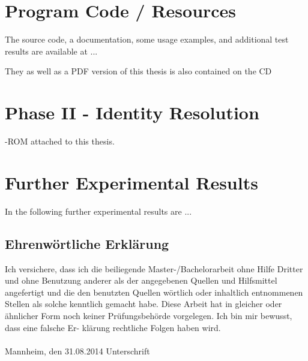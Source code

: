 \documentclass[11pt,titlepage,oneside,openany]{book}
\begin{document}




\appendix

\chapter{Program Code / Resources}
\label{cha:appendix-a}

The source code, a documentation, some usage examples, and additional test results are available at ...

They as well as a PDF version of this thesis is also contained on the CD\chapter{Phase II - Identity Resolution}
\label{cha:intro}-ROM attached to this thesis.

\chapter{Further Experimental Results}
\label{cha:appendix-b}

In the following further experimental results are ...


\newpage


\pagestyle{empty}


\section*{Ehrenw\"ortliche Erkl\"arung}
Ich versichere, dass ich die beiliegende Master-/Bachelorarbeit ohne Hilfe Dritter
und ohne Benutzung anderer als der angegebenen Quellen und Hilfsmittel
angefertigt und die den benutzten Quellen w\"ortlich oder inhaltlich
entnommenen Stellen als solche kenntlich gemacht habe. Diese Arbeit
hat in gleicher oder \"ahnlicher Form noch keiner Pr\"ufungsbeh\"orde
vorgelegen. Ich bin mir bewusst, dass eine falsche Er- kl\"arung rechtliche Folgen haben
wird.
\\
\\

\noindent
Mannheim, den 31.08.2014 \hspace{4cm} Unterschrift
\end{document}
